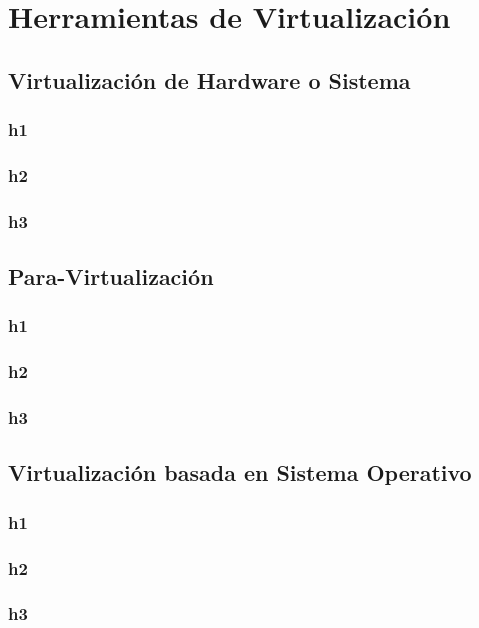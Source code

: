 \chapter{Herramientas de Virtualización}

\section{Virtualización de Hardware o Sistema}
\subsection{h1}
\subsection{h2}
\subsection{h3}

\section{Para-Virtualización}
\subsection{h1}
\subsection{h2}
\subsection{h3}

\section{Virtualización basada en Sistema Operativo}
\subsection{h1}
\subsection{h2}
\subsection{h3}